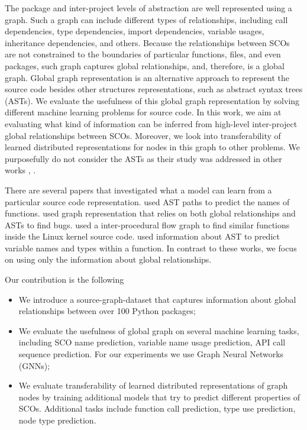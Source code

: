 \documentclass[a4paper,twoside]{article}
\begin{document}
The package and inter-project levels of abstraction are well represented using a graph. Such a graph can include different types of relationships, including call dependencies, type dependencies, import dependencies, variable usages, inheritance dependencies, and others. Because the relationships between SCOs are not constrained to the boundaries of particular functions, files, and even packages, such graph captures global relationships, and, therefore, is a global graph. Global graph representation is an alternative approach to represent the source code besides other structures representations, such as abstract syntax trees (ASTs). We evaluate the usefulness of this global graph representation by solving different machine learning problems for source code. In this work, we aim at evaluating what kind of information can be inferred from high-level inter-project global relationships between SCOs. Moreover, we look into transferability of learned distributed representations for nodes in this graph to other problems. We purposefully do not consider the ASTs as their study was addressed in other works \cite{Alon2018}, \cite{Yahav2018}.

There are several papers that investigated what a model can learn from a particular source code representation. \cite{Alon2018a} used AST paths to predict the names of functions. \cite{Allamanis2017} used graph representation that relies on both global relationships and ASTs to find bugs. \cite{DeFreez2018} used a inter-procedural flow graph to find similar functions inside the Linux kernel source code. \cite{Raychev2015} used information about AST to predict variable names and types within a function. In contrast to these works, we focus on using only the information about global relationships. 

Our contribution is the following
\begin{itemize}
    \item We introduce a source-graph-dataset that captures information about global relationships between over 100 Python packages;
    \item We evaluate the usefulness of global graph on several machine learning tasks, including SCO name prediction, variable name usage prediction, API call sequence prediction. For our experiments we use Graph Neural Networks (GNNs);
    \item We evaluate transferability of learned distributed representations of graph nodes by training additional models that try to predict different properties of SCOs. Additional tasks include function call prediction, type use prediction, node type prediction.
\end{itemize}
\end{document}

